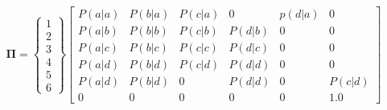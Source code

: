 \begin{equation}
\label{eq:matrix}
\boldsymbol{\Pi} = 
\begin{Bmatrix} 
 1          \\ 2        \\3             \\4         \\5         \\ 6 
\end{Bmatrix}
\begin{bmatrix} 
P(a|a) 	& P(b|a) 		& P(c|a) 		& 0			  & p(d|a) 	& 0  \\
P(a|b) 	& P(b|b) 		& P(c|b) 		& P(d|b)	  & 0 	    & 0  \\
P(a|c) 	& P(b|c) 		& P(c|c) 		& P(d|c) 	  & 0 	    & 0  \\
P(a|d) 	& P(b|d) 		& P(c|d) 		& P(d|d)	  & 0 	    & 0  \\
P(a|d) 	& P(b|d) 		&  0	 	    & P(d|d)	  & 0 	    & P(c|d)  \\
0			& 0			& 0		        & 0    		  & 0		& 1.0
\end{bmatrix}
\end{equation} 

